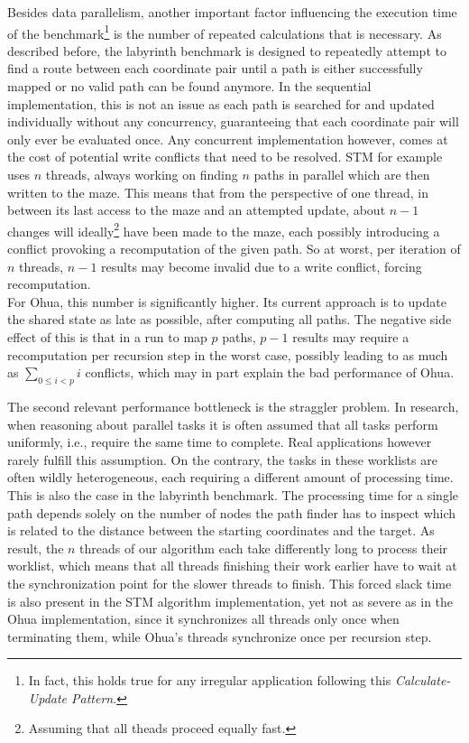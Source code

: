 Besides data parallelism, another important factor influencing the execution time of the benchmark\footnote{In fact, this holds true for any irregular application following this \emph{Calculate-Update Pattern}.} is the number of repeated calculations that is necessary.
As described before, the labyrinth benchmark is designed to repeatedly attempt to find a route between each coordinate pair until a path is either successfully mapped or no valid path can be found anymore.
In the sequential implementation, this is not an issue as each path is searched for and updated individually without any concurrency, guaranteeing that each coordinate pair will only ever be evaluated once.
Any concurrent implementation however, comes at the cost of potential write conflicts that need to be resolved.
STM for example uses $n$ threads, always working on finding $n$ paths in parallel which are then written to the maze.
This means that from the perspective of one thread, in between its last access to the maze and an attempted update, about $n - 1$ changes will ideally\footnote{Assuming that all theads proceed equally fast.} have been made to the maze, each possibly introducing a conflict provoking a recomputation of the given path.
So at worst, per iteration of $n$ threads, $n-1$ results may become invalid due to a write conflict, forcing recomputation.\\
For Ohua, this number is significantly higher.
Its current approach is to update the shared state as late as possible, after computing all paths.
The negative side effect of this is that in a run to map $p$ paths, $p-1$ results may require a recomputation per recursion step in the worst case, possibly leading to as much as $\sum_{0 \leq i < p} i$ conflicts, which may in part explain the bad performance of Ohua.

The second relevant performance bottleneck is the straggler problem.
In research, when reasoning about parallel tasks it is often assumed that all tasks perform uniformly, i.e., require the same time to complete.
Real applications however rarely fulfill this assumption.
On the contrary, the tasks in these worklists are often wildly heterogeneous, each requiring a different amount of processing time.
This is also the case in the labyrinth benchmark.
The processing time for a single path depends solely on the number of nodes the path finder has to inspect which is related to the distance between the starting coordinates and the target.
As result, the $n$ threads of our algorithm each take differently long to process their worklist, which means that all threads finishing their work earlier have to wait at the synchronization point for the slower threads to finish.
This forced slack time is also present in the STM algorithm implementation, yet not as severe as in the Ohua implementation, since it synchronizes all threads only once when terminating them, while Ohua's threads synchronize once per recursion step.



